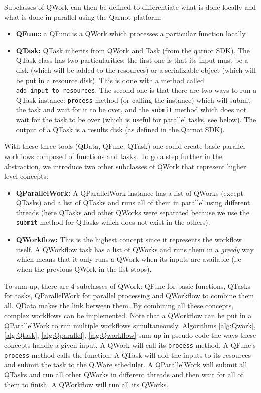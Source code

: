 \documentclass[10pt, conference, compsocconf]{IEEEtran}
\begin{document}
Subclasses of QWork can then be defined to differentiate what is done locally and what is done in parallel using the Qarnot platform: 
\begin{itemize}
\item \textbf{QFunc:} a QFunc is a QWork which processes a particular function locally.
\item \textbf{QTask:} QTask inherits from QWork and Task (from the qarnot SDK). The QTask class has two particularities: 
the first one is that its input must be a disk (which will be added to the resources) or a serializable object (which will be put in a resource disk). This is done with a method called \texttt{add\_input\_to\_resources}. The second one is that there are two ways to run a QTask instance: \texttt{process} method (or calling the instance) which will submit the task and wait for it to be over, and the \texttt{submit} method which does not wait for the task to be over (which is useful for parallel tasks, see below). The output of a QTask is a results disk (as defined in the Qarnot SDK).
\end{itemize}
With these three tools (QData, QFunc, QTask) one could create basic parallel workflows composed of functions and tasks. To go a step further in the abstraction, we introduce two other subclasses of QWork that represent higher level concepts: 
\begin{itemize}
\item \textbf{QParallelWork:} A QParallelWork instance has a list of QWorks (except QTasks) and a list of QTasks and runs all of them in parallel using different threads (here QTasks and other QWorks were separated because we use the \texttt{submit} method for QTasks which does not exist in the others).
\item \textbf{QWorkflow:} This is the highest concept since it represents the workflow itself. A QWorkflow task has a list of QWorks and runs them in a {\it greedy} way which means that it only runs a QWork when its inputs are available (i.e when the previous QWork in the list stops).
\end{itemize}

To sum up, there are 4 subclasses of QWork: QFunc for basic functions, QTasks for tasks, QParallelWork for parallel processing and QWorkflow to combine them all. QData makes the link between them.
By combining all these concepts, complex workflows can be implemented. Note that a QWorkflow can be put in a QParallelWork to run multiple workflows simultaneously. 
Algorithms \ref{alg:Qwork}, \ref{alg:Qtask}, \ref{alg:Qparallel}, \ref{alg:Qworkflow} sum up in pseudo-code the ways these concepts handle a given input. A QWork will call its \texttt{process} method. A QFunc's \texttt{process} method calls the function. A QTask will add the inputs to its resources and submit the task to the Q.Ware scheduler. A QParallelWork will submit all QTasks and run all other QWorks in different threads and then wait for all of them to finish. A QWorkflow will run all its QWorks.
\end{document}
